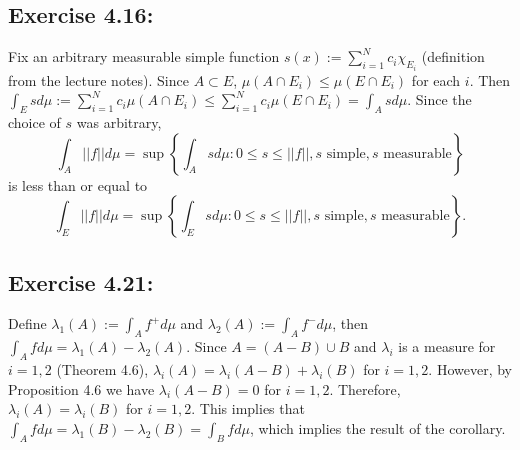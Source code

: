 \documentclass[11.5pt, letterpaper, bibtotoc,
    tablecaptionabove, figurecaptionabove]{article}
\begin{document}
\subsection*{Exercise 4.16:}\label{ex416}
Fix an arbitrary measurable simple function $s(x):=\sum_{i=1}^Nc_i\chi_{E_i}$ 
(definition from the lecture notes).
Since $A\subset E$, $\mu(A\cap E_i)\leq\mu(E\cap E_i)$ for each $i$.
Then $\int_Esd\mu:=\sum_{i=1}^Nc_i\mu(A\cap E_i)\leq\sum_{i=1}^Nc_i\mu(E\cap E_i) =\int_Asd\mu$.
Since the choice of $s$ was arbitrary, 
\begin{equation*}
    \int_A||f||d\mu=\sup\left\{\int_Asd\mu: 0\leq s\leq||f||, 
    s \text{ simple}, s \text{ measurable}\right\}
\end{equation*}
is less than or equal to
\begin{equation*}
    \int_E||f||d\mu=\sup\left\{\int_Esd\mu: 0\leq s\leq||f||,
    s \text{ simple}, s \text{ measurable}\right\}.
\end{equation*}

\subsection*{Exercise 4.21:}
Define $\lambda_1(A):=\int_Af^+d\mu$ and $\lambda_2(A):=\int_Af^-d\mu$,
then $\int_Afd\mu=\lambda_1(A)-\lambda_2(A)$.
Since $A=(A-B)\cup B$ and $\lambda_i$ is a measure for $i=1,2$ (Theorem 4.6), 
$\lambda_i(A)=\lambda_i(A-B)+\lambda_i(B)$ for $i=1,2$.
However, by Proposition 4.6 we have $\lambda_i(A-B)=0$ for $i=1,2$.
Therefore, $\lambda_i(A)=\lambda_i(B)$ for $i=1,2$.
This implies that $\int_Afd\mu=\lambda_1(B)-\lambda_2(B)=\int_Bfd\mu$,
which implies the result of the corollary.
\end{document}
